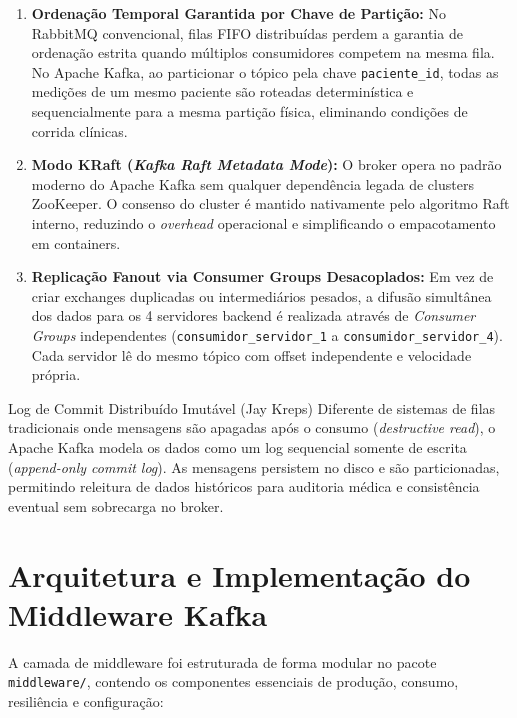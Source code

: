 \documentclass[11pt,a4paper]{article}
\begin{document}
\begin{enumerate}
    \item \textbf{Ordenação Temporal Garantida por Chave de Partição:} No RabbitMQ convencional, filas FIFO distribuídas perdem a garantia de ordenação estrita quando múltiplos consumidores competem na mesma fila. No Apache Kafka, ao particionar o tópico pela chave \texttt{paciente\_id}, todas as medições de um mesmo paciente são roteadas determinística e sequencialmente para a mesma partição física, eliminando condições de corrida clínicas.
    \item \textbf{Modo KRaft (\textit{Kafka Raft Metadata Mode}):} O broker opera no padrão moderno do Apache Kafka sem qualquer dependência legada de clusters ZooKeeper. O consenso do cluster é mantido nativamente pelo algoritmo Raft interno, reduzindo o \textit{overhead} operacional e simplificando o empacotamento em containers.
    \item \textbf{Replicação Fanout via Consumer Groups Desacoplados:} Em vez de criar exchanges duplicadas ou intermediários pesados, a difusão simultânea dos dados para os 4 servidores backend é realizada através de \textit{Consumer Groups} independentes (\texttt{consumidor\_servidor\_1} a \texttt{consumidor\_servidor\_4}). Cada servidor lê do mesmo tópico com offset independente e velocidade própria.
\end{enumerate}

\begin{fundamento}{Log de Commit Distribuído Imutável (Jay Kreps)}
Diferente de sistemas de filas tradicionais onde mensagens são apagadas após o consumo (\textit{destructive read}), o Apache Kafka modela os dados como um log sequencial somente de escrita (\textit{append-only commit log}). As mensagens persistem no disco e são particionadas, permitindo releitura de dados históricos para auditoria médica e consistência eventual sem sobrecarga no broker.
\end{fundamento}

\section{Arquitetura e Implementação do Middleware Kafka}

A camada de middleware foi estruturada de forma modular no pacote \texttt{middleware/}, contendo os componentes essenciais de produção, consumo, resiliência e configuração:
\end{document}
